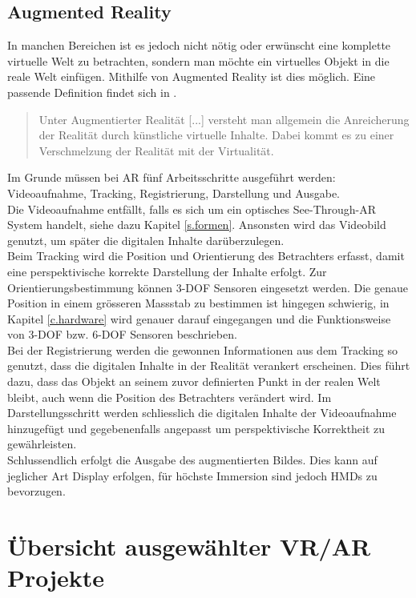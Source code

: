 \section{Augmented Reality}
In manchen Bereichen ist es jedoch nicht nötig oder erwünscht eine komplette virtuelle Welt zu betrachten, sondern man möchte ein virtuelles Objekt in die reale Welt einfügen. Mithilfe von Augmented Reality ist dies möglich. Eine passende Definition findet sich in \cite{doerner13}.
\begin{quote}
Unter Augmentierter Realität [...] versteht man allgemein die Anreicherung der Realität durch künstliche virtuelle Inhalte. Dabei kommt es zu einer Verschmelzung der Realität mit der Virtualität.
\end{quote}
Im Grunde müssen bei AR fünf Arbeitsschritte ausgeführt werden: Videoaufnahme, Tracking, Registrierung, Darstellung und Ausgabe.\\[6pt]  
Die Videoaufnahme entfällt, falls es sich um ein optisches See-Through-AR System handelt, siehe dazu Kapitel \ref{s.formen}. Ansonsten wird das Videobild genutzt, um später die digitalen Inhalte darüberzulegen.\\[6pt]   
Beim Tracking wird die Position und Orientierung des Betrachters erfasst, damit eine perspektivische korrekte Darstellung der Inhalte erfolgt. Zur Orientierungsbestimmung können 3-DOF Sensoren eingesetzt werden. Die genaue Position in einem grösseren Massstab zu bestimmen ist hingegen schwierig, in Kapitel \ref{c.hardware} wird genauer darauf eingegangen und die Funktionsweise von 3-DOF bzw. 6-DOF Sensoren beschrieben.\\[6pt]  
 Bei der Registrierung werden die gewonnen Informationen aus dem Tracking so genutzt, dass die digitalen Inhalte in der Realität verankert erscheinen. Dies führt dazu, dass das Objekt an seinem zuvor definierten Punkt in der realen Welt bleibt, auch wenn die Position des Betrachters verändert wird. 
 Im Darstellungsschritt werden schliesslich die digitalen Inhalte der Videoaufnahme hinzugefügt und gegebenenfalls angepasst um perspektivische Korrektheit zu gewährleisten.\\[6pt]  
 Schlussendlich erfolgt die Ausgabe des augmentierten Bildes. Dies kann auf jeglicher Art Display erfolgen, für höchste Immersion sind jedoch HMDs zu bevorzugen.\cite[S.~241~ff.]{doerner13}

\chapter{Übersicht ausgewählter VR/AR Projekte}\label{c.projects}
\vspace{-20pt}
